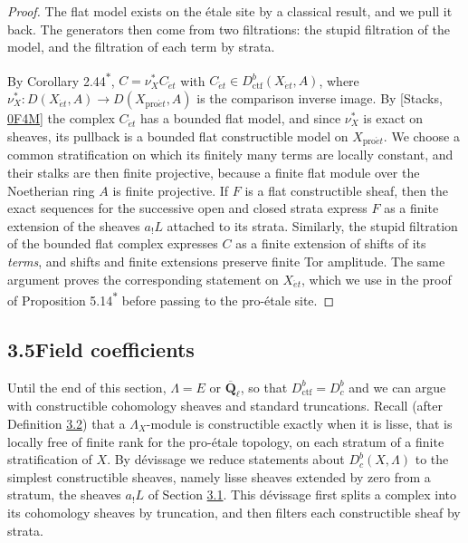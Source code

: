 \documentclass[11pt]{article}
\newcommand{\bpout}[1]{#1\textsuperscript{\hyperlink{bp-outside}{\ensuremath{\ast}}}}
\providecommand{\Dbc}{}\renewcommand{\Dbc}{D^b_c}
\begin{document}
\begin{proof}[{Proof}]\label{bp44}%
The flat model exists on the étale site by a classical result, and we pull it back. The generators then come from two filtrations: the stupid filtration of the model, and the filtration of each term by strata.

By Corollary \bpout{2.44}, \(C=\nu_X^*C_{\acute{e}t}\) with \(C_{\acute{e}t}\in D^b_{\mathrm{ctf}}(X_{\acute{e}t},A)\), where \(\nu_X^*:D(X_{\acute{e}t},A)\to D(X_{\mathrm{pro}\acute{e}t},A)\) is the comparison inverse image. By [Stacks, \href{https://stacks.math.columbia.edu/tag/0F4M}{0F4M}] the complex \(C_{\acute{e}t}\) has a bounded flat model, and since \(\nu_X^*\) is exact on sheaves, its pullback is a bounded flat constructible model on \(X_{\mathrm{pro}\acute{e}t}\). We choose a common stratification on which its finitely many terms are locally constant, and their stalks are then finite projective, because a finite flat module over the Noetherian ring \(A\) is finite projective. If \(F\) is a flat constructible sheaf, then the exact sequences for the successive open and closed strata express \(F\) as a finite extension of the sheaves \(a_!L\) attached to its strata. Similarly, the stupid filtration of the bounded flat complex expresses \(C\) as a finite extension of shifts of its \emph{terms}, and shifts and finite extensions preserve finite Tor amplitude. The same argument proves the corresponding statement on \(X_{\acute{e}t}\), which we use in the proof of Proposition \bpout{5.14} before passing to the pro-étale site.
\end{proof}


\subsection*{\texorpdfstring{3.5\quad Field coefficients}{3.5 Field coefficients}}
\label{bp45}%
\label{bp46}%
Until the end of this section, \(\Lambda=E\) or \(\overline{\mathbf Q}_\ell\), so that \(D^b_{\mathrm{ctf}}=\Dbc\) and we can argue with constructible cohomology sheaves and standard truncations. Recall (after Definition \hyperref[bp9]{3.2}) that a \(\Lambda_X\)-module is constructible exactly when it is lisse, that is locally free of finite rank for the pro-étale topology, on each stratum of a finite stratification of \(X\). By dévissage we reduce statements about \(\Dbc(X,\Lambda)\) to the simplest constructible sheaves, namely lisse sheaves extended by zero from a stratum, the sheaves \(a_!L\) of Section \hyperref[bp3]{3.1}. This dévissage first splits a complex into its cohomology sheaves by truncation, and then filters each constructible sheaf by strata.
\end{document}
